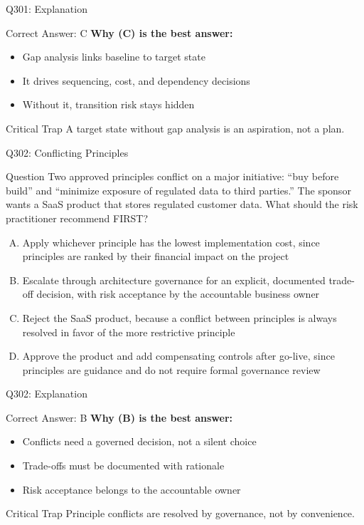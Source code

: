 \documentclass{beamer}
\begin{document}
	\begin{frame}{Q301: Explanation}
		\begin{block}{Correct Answer: C}
			\textbf{Why (C) is the best answer:}
			\begin{itemize}
				\item Gap analysis links baseline to target state
				\item It drives sequencing, cost, and dependency decisions
				\item Without it, transition risk stays hidden
			\end{itemize}
		\end{block}
		\begin{alertblock}{Critical Trap}
			A target state without gap analysis is an aspiration, not a plan.
		\end{alertblock}
	\end{frame}
	
	\begin{frame}{Q302: Conflicting Principles}
		\begin{block}{Question}
			\small Two approved principles conflict on a major initiative: ``buy before build'' and ``minimize exposure of regulated data to third parties.'' The sponsor wants a SaaS product that stores regulated customer data. What should the risk practitioner recommend FIRST?
		\end{block}
		\begin{enumerate}[(A)]
			\footnotesize
			\item Apply whichever principle has the lowest implementation cost, since principles are ranked by their financial impact on the project
			\item Escalate through architecture governance for an explicit, documented trade-off decision, with risk acceptance by the accountable business owner
			\item Reject the SaaS product, because a conflict between principles is always resolved in favor of the more restrictive principle
			\item Approve the product and add compensating controls after go-live, since principles are guidance and do not require formal governance review
		\end{enumerate}
	\end{frame}
	
	\begin{frame}{Q302: Explanation}
		\begin{block}{Correct Answer: B}
			\textbf{Why (B) is the best answer:}
			\begin{itemize}
				\item Conflicts need a governed decision, not a silent choice
				\item Trade-offs must be documented with rationale
				\item Risk acceptance belongs to the accountable owner
			\end{itemize}
		\end{block}
		\begin{alertblock}{Critical Trap}
			Principle conflicts are resolved by governance, not by convenience.
		\end{alertblock}
	\end{frame}
	
\end{document}
